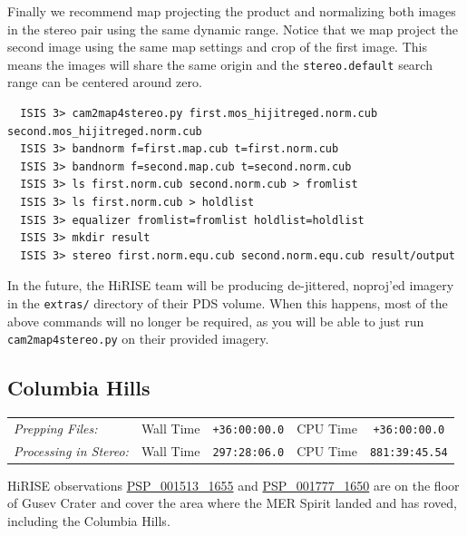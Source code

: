 Finally we recommend map projecting the product and normalizing both
images in the stereo pair using the same dynamic range. Notice that we
map project the second image using the same map settings and crop of
the first image. This means the images will share the same origin and
the {\tt stereo.default} search range can be centered around zero.

\begin{verbatim}
  ISIS 3> cam2map4stereo.py first.mos_hijitreged.norm.cub second.mos_hijitreged.norm.cub 
  ISIS 3> bandnorm f=first.map.cub t=first.norm.cub
  ISIS 3> bandnorm f=second.map.cub t=second.norm.cub
  ISIS 3> ls first.norm.cub second.norm.cub > fromlist
  ISIS 3> ls first.norm.cub > holdlist
  ISIS 3> equalizer fromlist=fromlist holdlist=holdlist
  ISIS 3> mkdir result
  ISIS 3> stereo first.norm.equ.cub second.norm.equ.cub result/output
\end{verbatim}

In the future, the HiRISE team will be producing de-jittered, noproj'ed
imagery in the \texttt{extras/} directory of their \ac{PDS} volume.
When this happens, most of the above commands will no longer be required,
as you will be able to just run \texttt{cam2map4stereo.py} on their provided imagery.

\subsection{Columbia Hills}

\begin{tabular}{ l r c r c}
\textit{Prepping Files:}       & Wall Time & \texttt{+36:00:00.0} & CPU Time & \texttt{+36:00:00.0} \\
\textit{Processing in Stereo:} & Wall Time & \texttt{297:28:06.0} & CPU Time & \texttt{881:39:45.54} \\
\end{tabular}

\ac{HiRISE} observations
\href{http://hirise.lpl.arizona.edu/PSP_001513_1655}{PSP\_001513\_1655} and
\href{http://hirise.lpl.arizona.edu/PSP_001777_1650}{PSP\_001777\_1650}
are on the floor of Gusev Crater and cover the area where the \ac{MER} 
Spirit landed and has roved, including the Columbia Hills.

